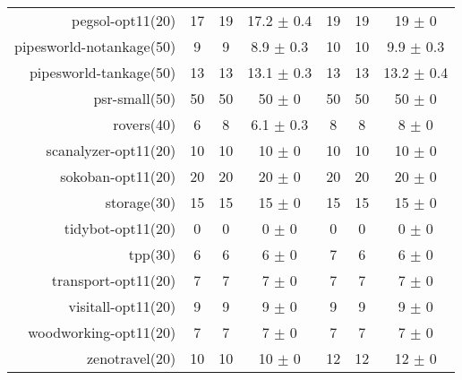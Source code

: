 \begin{center}
\begin{tabular}{|r|*{2}{ccc|}}
pegsol-opt11(20) & 17 & 19 & 17.2 \(\pm\) 0.4 & 19 & 19 & 19 \(\pm\) 0\\
pipesworld-notankage(50) & 9 & 9 & 8.9 \(\pm\) 0.3 & 10 & 10 & 9.9 \(\pm\) 0.3\\
pipesworld-tankage(50) & 13 & 13 & 13.1 \(\pm\) 0.3 & 13 & 13 & 13.2 \(\pm\) 0.4\\
psr-small(50) & 50 & 50 & 50 \(\pm\) 0 & 50 & 50 & 50 \(\pm\) 0\\
rovers(40) & 6 & 8 & 6.1 \(\pm\) 0.3 & 8 & 8 & 8 \(\pm\) 0\\
scanalyzer-opt11(20) & 10 & 10 & 10 \(\pm\) 0 & 10 & 10 & 10 \(\pm\) 0\\
sokoban-opt11(20) & 20 & 20 & 20 \(\pm\) 0 & 20 & 20 & 20 \(\pm\) 0\\
storage(30) & 15 & 15 & 15 \(\pm\) 0 & 15 & 15 & 15 \(\pm\) 0\\
tidybot-opt11(20) & 0 & 0 & 0 \(\pm\) 0 & 0 & 0 & 0 \(\pm\) 0\\
tpp(30) & 6 & 6 & 6 \(\pm\) 0 & 7 & 6 & 6 \(\pm\) 0\\
transport-opt11(20) & 7 & 7 & 7 \(\pm\) 0 & 7 & 7 & 7 \(\pm\) 0\\
visitall-opt11(20) & 9 & 9 & 9 \(\pm\) 0 & 9 & 9 & 9 \(\pm\) 0\\
woodworking-opt11(20) & 7 & 7 & 7 \(\pm\) 0 & 7 & 7 & 7 \(\pm\) 0\\
zenotravel(20) & 10 & 10 & 10 \(\pm\) 0 & 12 & 12 & 12 \(\pm\) 0\\
\end{tabular}
\end{center}
